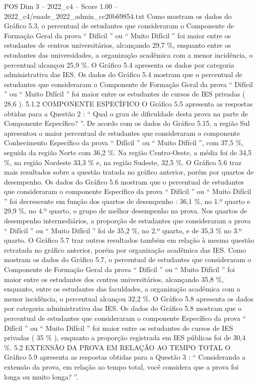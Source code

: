 \begin{textsample}{POS Dim 3 – 2022\_c4 – Score 1.00 – 2022\_c4/enade\_2022\_admin\_cc20b69854.txt}
Como mostram os dados do Gráfico 5.3, o percentual de estudantes que consideraram o Componente de Formação Geral da prova “ Difícil ” ou “ Muito Difícil ” foi maior entre os estudantes de centros universitários, alcançando 29,7 \%, enquanto entre os estudantes das universidades, a organização acadêmica com a menor incidência, o percentual alcançou 25,9 \%.
O Gráfico 5.4 apresenta os dados por categoria administrativa das IES.
Os dados do Gráfico 5.4 mostram que o percentual de estudantes que consideraram o Componente de Formação Geral da prova “ Difícil ” ou “ Muito Difícil ” foi maior entre os estudantes de cursos de IES privadas ( 28,6 ). 5.1.2 COMPONENTE ESPECÍFICO O Gráfico 5.5 apresenta as respostas obtidas para a Questão 2 : “ Qual o grau de dificuldade desta prova na parte de Componente Específico? ”.
De acordo com os dados do Gráfico 5.15, a região Sul apresentou o maior percentual de estudantes que consideraram o componente Conhecimento Específico da prova “ Difícil ” ou “ Muito Difícil ”, com 37,5 \%, seguida da região Norte com 36,2 \%.
Na região Centro-Oeste, a média foi de 34,5 \%, na região Nordeste 33,3 \% e, na região Sudeste, 32,5 \%.
O Gráfico 5.6 traz mais resultados sobre a questão tratada no gráfico anterior, porém por quartos de desempenho.
Os dados do Gráfico 5.6 mostram que o percentual de estudantes que consideraram o componente Específico da prova “ Difícil ” ou “ Muito Difícil ” foi decrescente em função dos quartos de desempenho : 36,1 \%, no 1.º quarto e 29,9 \%, no 4.º quarto, o grupo de melhor desempenho na prova.
Nos quartos de desempenho intermediários, a proporção de estudantes que consideraram a prova “ Difícil ” ou “ Muito Difícil ” foi de 35,2 \%, no 2.º quarto, e de 35,3 \% no 3.º quarto.
O Gráfico 5.7 traz outros resultados também em relação à mesma questão retratada no gráfico anterior, porém por organização acadêmica das IES.
Como mostram os dados do Gráfico 5.7, o percentual de estudantes que consideraram o Componente de Formação Geral da prova “ Difícil ” ou “ Muito Difícil ” foi maior entre os estudantes dos centros universitários, alcançando 35,8 \%, enquanto, entre os estudantes das faculdades, a organização acadêmica com a menor incidência, o percentual alcançou 32,2 \%.
O Gráfico 5.8 apresenta os dados por categoria administrativa das IES.
Os dados do Gráfico 5.8 mostram que o percentual de estudantes que consideraram o componente Específico da prova “ Difícil ” ou “ Muito Difícil ” foi maior entre os estudantes de cursos de IES privadas ( 35 \% ), enquanto a proporção registrada em IES públicas foi de 30,4 \%. 5.2 EXTENSÃO DA PROVA EM RELAÇÃO AO TEMPO TOTAL O Gráfico 5.9 apresenta as respostas obtidas para a Questão 3 : “ Considerando a extensão da prova, em relação ao tempo total, você considera que a prova foi longa ou muito longa? ”.

\end{textsample}
